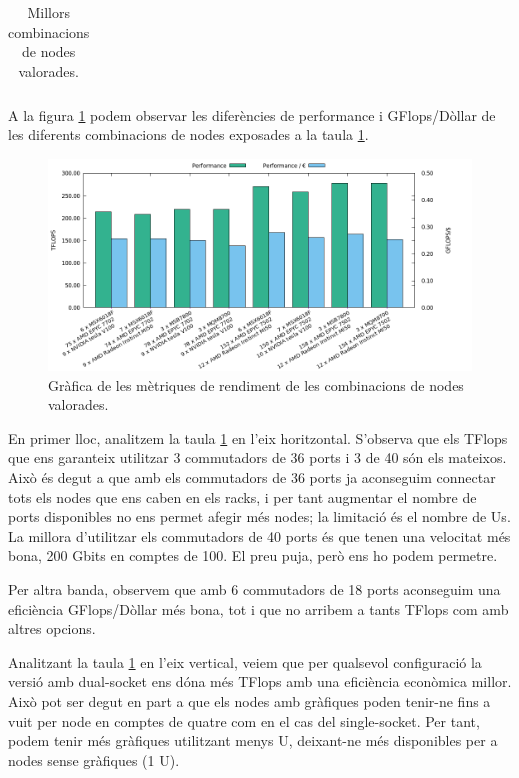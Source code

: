 \begin{table}[H]
\begin{adjustwidth}{-1.5in}{-1.5in}
\begin{center}
\begin{tabular}{llc|c|c|c}
\end{tabular}
\caption{Millors combinacions de nodes valorades.}
    \label{tab:summary}
\end{center}
\end{adjustwidth}
\end{table}

A la figura \ref{fig:summary} podem observar les diferències de performance i GFlops/Dòllar de les diferents combinacions de nodes exposades a la taula \ref{tab:summary}.
\begin{figure}[H]
    \centering
    \includegraphics[width=\textwidth]{img/summary}
    \caption{Gràfica de les mètriques de rendiment de les combinacions de nodes valorades.}
    \label{fig:summary}
\end{figure}

En primer lloc, analitzem la taula \ref{tab:summary} en l'eix horitzontal. S'observa que els TFlops que ens garanteix utilitzar 3 commutadors de 36 ports i 3 de 40 són els mateixos. Això és degut a que amb els commutadors de 36 ports ja aconseguim connectar tots els nodes que ens caben en els racks, i per tant augmentar el nombre de ports disponibles no ens permet afegir més nodes; la limitació és el nombre de Us. La millora d'utilitzar els commutadors de 40 ports és que tenen una velocitat més bona, 200 Gbits en comptes de 100. El preu puja, però ens ho podem permetre.

Per altra banda, observem que amb 6 commutadors de 18 ports aconseguim una eficiència GFlops/Dòllar més bona, tot i que no arribem a tants TFlops com amb altres opcions.

Analitzant la taula \ref{tab:summary} en l'eix vertical, veiem que per qualsevol configuració la versió amb dual-socket ens dóna més TFlops amb una eficiència econòmica millor. Això pot ser degut en part a que els nodes amb gràfiques poden tenir-ne fins a vuit per node en comptes de quatre com en el cas del single-socket. Per tant, podem tenir més gràfiques utilitzant menys U, deixant-ne més disponibles per a nodes sense gràfiques (1 U).


